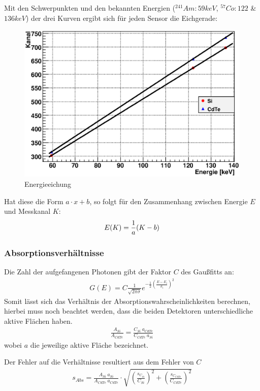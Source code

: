 \documentclass[12pt]{article}
\begin{document}
Mit den Schwerpunkten und den bekannten Energien ($^{241}Am:59keV$, $^{57}Co:122$ \& $136keV$) der drei Kurven ergibt sich für jeden Sensor die Eichgerade:
\begin{figure}[H]
\centering
\includegraphics[width=0.9\linewidth]{../plot/eps/gamma/finalfit.eps}
\caption{Energieeichung}
\end{figure}
Hat diese die Form $a \cdot x + b$, so folgt für den Zusammenhang zwischen Energie $E$ und Messkanal $K$:
\begin{align}
 \notag	E(K) = \frac{1}{a}(K-b)
\end{align}


\subsubsection{Absorptionsverhältnisse}
Die Zahl der aufgefangenen Photonen gibt der Faktor $C$ des Gaußfitts an:
\begin{align*}
 G(E) = C \frac{1}{\sqrt{2 \pi \sigma}} e^{-\frac{1}{2}\left(\frac{E-E_i}{\sigma_i}\right)^2}
\end{align*}
Somit lässt sich das Verhältnis der Absorptionswahrscheinlichkeiten berechnen, hierbei muss noch beachtet werden, dass die beiden Detektoren unterschiedliche aktive Flächen haben.
\begin{align*}
 \frac{A_{Si}}{A_{CdTe}} = \frac{C_{Si}~a_{CdTe}}{C_{CdTe}~a_{Si}}
\end{align*}
wobei $a$ die jeweilige aktive Fläche bezeichnet.

Der Fehler auf die Verhältnisse resultiert aus dem Fehler von $C$
\begin{align*}
 s_{Abs} = \frac{A_{Si}~a_{Si}}{A_{CdTe}~a_{CdTe}} \cdot \sqrt{\left(\frac{s_{C_{Si}}}{C_{Si}}\right)^2 + \left(\frac{s_{C_{CdTe}}}{C_{CdTe}}\right)^2}
\end{align*}
\end{document}
